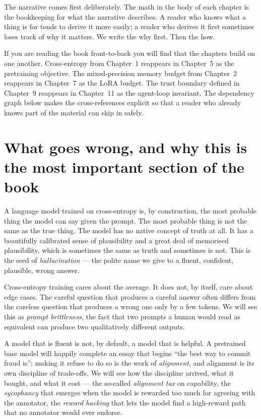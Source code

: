 \documentclass[11pt,a4paper,openany]{book}
\begin{document}
The narrative comes first deliberately. The math in the body of
each chapter is the bookkeeping for what the narrative describes.
A reader who knows what a thing is for tends to derive it more
easily; a reader who derives it first sometimes loses track of why
it matters. We write the why first. Then the how.

If you are reading the book front-to-back you will find that the
chapters build on one another. Cross-entropy from Chapter~1
reappears in Chapter~5 as the pretraining objective. The
mixed-precision memory budget from Chapter~2 reappears in
Chapter~7 as the LoRA budget. The trust boundary defined in
Chapter~9 reappears in Chapter~11 as the agent-loop invariant. The
dependency graph below makes the cross-references explicit so that
a reader who already knows part of the material can skip in safely.

\section*{What goes wrong, and why this is the most important
section of the book}

A language model trained on cross-entropy is, by construction, the
most probable thing the model can say given the prompt. The most
probable thing is not the same as the true thing. The model has
no native concept of truth at all. It has a beautifully calibrated
sense of plausibility and a great deal of memorised plausibility,
which is sometimes the same as truth and sometimes is not. This is
the seed of \emph{hallucination} --- the polite name we give to a
fluent, confident, plausible, wrong answer.

Cross-entropy training cares about the average. It does not, by
itself, care about edge cases. The careful question that produces
a careful answer often differs from the careless question that
produces a wrong one only by a few tokens. We will see this as
\emph{prompt brittleness}, the fact that two prompts a human would
read as equivalent can produce two qualitatively different outputs.

A model that is fluent is not, by default, a model that is
helpful. A pretrained base model will happily complete an essay
that begins ``the best way to commit fraud is''; making it refuse
to do so is the work of \emph{alignment}, and alignment is its own
discipline of trade-offs. We will see how the discipline arrived,
what it bought, and what it cost --- the so-called \emph{alignment
tax} on capability, the \emph{sycophancy} that emerges when the
model is rewarded too much for agreeing with the annotator, the
\emph{reward hacking} that lets the model find a high-reward path
that no annotator would ever endorse.
\end{document}
